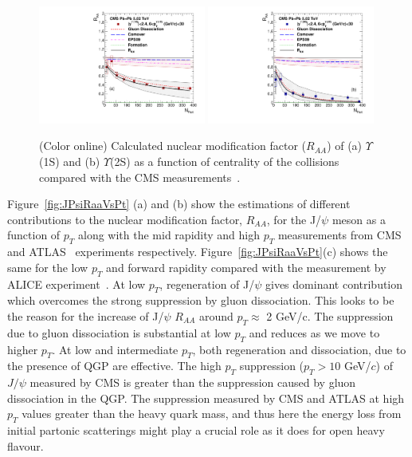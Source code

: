 \documentclass[12pt,a4paper,final]{iopart} %
\newcommand{\Jpsi}{J/\psi}
\begin{document}
\begin{figure}
\includegraphics[width=0.49\textwidth]{Fig8a_CMS_Y1SRAANPart_Shade.pdf}
\includegraphics[width=0.49\textwidth]{Fig8b_CMS_Y2SRAANPart_Shade.pdf}
\caption{(Color online) Calculated nuclear modification factor ($R_{AA}$) of 
  (a) $\Upsilon$(1S) and (b) $\Upsilon$(2S) as a function of centrality of the 
  collisions compared with the CMS measurements~\cite{CMS:2017ucd}.}
\label{fig:UpsilonRaaNPartCMS}
\end{figure}


Figure~\ref{fig:JPsiRaaVsPt} (a) and (b) show the estimations of different contributions
to the nuclear modification factor, $R_{AA}$, for the J/$\psi$ meson as a function of $p_T$ 
along with the mid rapidity and high $p_T$ measurements from
CMS~\cite{Sirunyan:2017isk} and ATLAS~\cite{ATLAS:2016qpn} experiments respectively.
Figure~\ref{fig:JPsiRaaVsPt}(c) shows the same for the low $p_T$ and forward
rapidity compared with the measurement by ALICE experiment~\cite{Adam:2016rdg}.
At low $p_T$, regeneration of J/$\psi$ gives dominant
contribution which overcomes the strong suppression by gluon dissociation.
This looks to be the reason for the increase of J/$\psi$ $R_{AA}$ around $p_T\approx$ 2 GeV/c. 
The suppression due to gluon dissociation is substantial at low $p_T$ and reduces as
we move to higher $p_T$. At low and intermediate $p_T$, both regeneration and dissociation, due
to the presence of QGP are effective.  The high $p_T$
suppression ($p_T > 10$  GeV/$c$) of $\Jpsi$ measured by CMS is greater than the
suppression caused by gluon dissociation in the QGP. The suppression measured
by CMS and ATLAS at high $p_T$ values greater than the heavy quark mass,
and thus here the energy loss from initial partonic scatterings might play a
crucial role as it does for open heavy flavour. 
\end{document}
